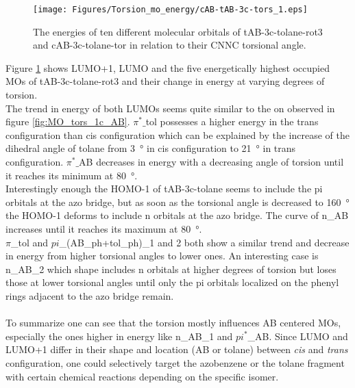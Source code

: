 %
%
%
%
%
\begin{figure}[H]
    \centering
    \texttt{[image: Figures/Torsion\_mo\_energy/cAB-tAB-3c-tors\_1.eps]}
    \caption{The energies of ten different molecular orbitals of tAB-3c-tolane-rot3 and cAB-3c-tolane-tor in relation to their CNNC torsional angle.}
    \label{fig:tAB-cAB-3c-tors_1}
\end{figure}
%
Figure \ref{fig:tAB-cAB-3c-tors_1} shows LUMO+1, LUMO and the five energetically highest occupied MOs of tAB-3c-tolane-rot3 and their change in energy at varying degrees of torsion. \\
The trend in energy of both LUMOs seems quite similar to the on observed in figure \ref{fig:MO_tors_1c_AB}. $\pi^*\_$tol possesses a higher energy in the trans configuration than cis configuration which can be explained by the increase of the dihedral angle of tolane from \SI{3}{\degree} in cis configuration to \SI{21}{\degree} in trans configuration. $\pi^*\_$AB decreases in energy with a decreasing angle of torsion until it reaches its minimum at \SI{80}{\degree}. \\
Interestingly enough the HOMO-1 of tAB-3c-tolane seems to include the pi orbitals at the azo bridge, but as soon as the torsional angle is decreased to \SI{160}{\degree} the HOMO-1 deforms to include n orbitals at the azo bridge. The curve of n\_AB increases until it reaches its maximum at \SI{80}{\degree}. \\
$\pi$\_tol and $pi$\_(AB\_ph+tol\_ph)\_1 and 2 both show a similar trend and decrease in energy from higher torsional angles to lower ones. An interesting case is n\_AB\_2 which shape includes n orbitals at higher degrees of torsion but loses those at lower torsional angles until only the pi orbitals localized on the phenyl rings adjacent to the azo bridge remain. \\
\\
To summarize one can see that the torsion mostly influences AB centered MOs, especially the ones higher in energy like n\_AB\_1 and $pi^*$\_AB. Since LUMO and LUMO+1 differ in their shape and location (AB or tolane) between \textit{cis} and \textit{trans} configuration, one could selectively target the azobenzene or the tolane fragment with certain chemical reactions depending on the specific isomer. 
%
%
%
